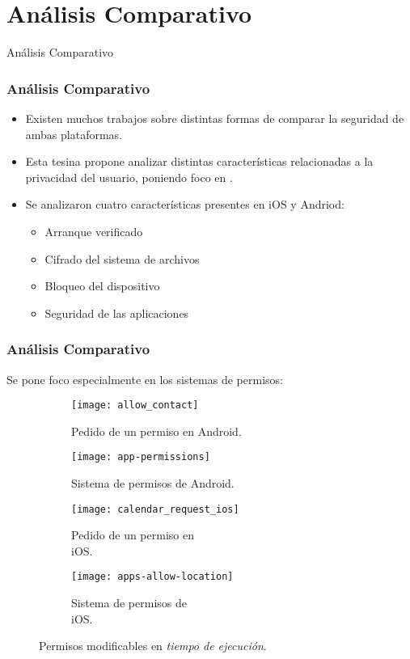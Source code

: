 \section{Análisis Comparativo}
\begin{frame}
 \begin{center}
  \LARGE Análisis Comparativo
 \end{center}
\end{frame}
\begin{frame}
 \frametitle{Análisis Comparativo}
 \begin{itemize}
  \item Existen muchos trabajos sobre distintas formas de comparar la seguridad de ambas plataformas.\pause
  \item Esta tesina propone analizar distintas características relacionadas a la privacidad del usuario, \pause poniendo foco en .\pause
  \item Se analizaron cuatro características presentes en iOS y Andriod:\pause
     \begin{itemize}[<+->]
      \item Arranque verificado
      \item Cifrado del sistema de archivos
      \item Bloqueo del dispositivo
      \item Seguridad de las aplicaciones
     \end{itemize}
 \end{itemize}
\end{frame}
\begin{frame}
 \frametitle{Análisis Comparativo}
Se pone foco especialmente en los sistemas de permisos:\pause
 \begin{figure}[btp]
    \centering
    \begin{subfigure}{0.23\linewidth}
        \texttt{[image: allow\_contact]}
        \caption{Pedido de un permiso en Android.}
    \end{subfigure}
    \begin{subfigure}{0.23\linewidth}
        \texttt{[image: app-permissions]}
        \caption{Sistema de permisos de Android.}
	\end{subfigure}\pause
	\begin{subfigure}{.23\linewidth}
    	\texttt{[image: calendar\_request\_ios]}
    	\caption{Pedido de un permiso en\\ iOS.}
    \end{subfigure}
    \begin{subfigure}{.23\linewidth}
    	\texttt{[image: apps-allow-location]}
    	\caption{Sistema de permisos de\\ iOS.}
	\end{subfigure}
	\caption{Permisos modificables en \emph{tiempo de ejecución}.}
\end{figure}
\end{frame}
